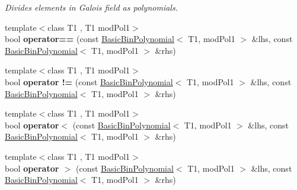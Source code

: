 \begin{DoxyCompactItemize}
\begin{DoxyCompactList}\small\item\em Divides elements in Galois field as polynomials. \end{DoxyCompactList}\item 
\mbox{\label{class_g_flinalg_1_1_basic_bin_polynomial_ab9397147b5c3c4330a067c57acf3b567}} 
{\footnotesize template$<$class T1 , T1 mod\+Pol1$>$ }\\bool {\bfseries operator==} (const \mbox{\hyperlink{class_g_flinalg_1_1_basic_bin_polynomial}{Basic\+Bin\+Polynomial}}$<$ T1, mod\+Pol1 $>$ \&lhs, const \mbox{\hyperlink{class_g_flinalg_1_1_basic_bin_polynomial}{Basic\+Bin\+Polynomial}}$<$ T1, mod\+Pol1 $>$ \&rhs)
\item 
\mbox{\label{class_g_flinalg_1_1_basic_bin_polynomial_a657967bf1ec7f712f306a2baf360d0bd}} 
{\footnotesize template$<$class T1 , T1 mod\+Pol1$>$ }\\bool {\bfseries operator !=} (const \mbox{\hyperlink{class_g_flinalg_1_1_basic_bin_polynomial}{Basic\+Bin\+Polynomial}}$<$ T1, mod\+Pol1 $>$ \&lhs, const \mbox{\hyperlink{class_g_flinalg_1_1_basic_bin_polynomial}{Basic\+Bin\+Polynomial}}$<$ T1, mod\+Pol1 $>$ \&rhs)
\item 
\mbox{\label{class_g_flinalg_1_1_basic_bin_polynomial_a81a0b19946f6ec76b2c8af6f5006bb7b}} 
{\footnotesize template$<$class T1 , T1 mod\+Pol1$>$ }\\bool {\bfseries operator$<$} (const \mbox{\hyperlink{class_g_flinalg_1_1_basic_bin_polynomial}{Basic\+Bin\+Polynomial}}$<$ T1, mod\+Pol1 $>$ \&lhs, const \mbox{\hyperlink{class_g_flinalg_1_1_basic_bin_polynomial}{Basic\+Bin\+Polynomial}}$<$ T1, mod\+Pol1 $>$ \&rhs)
\item 
\mbox{\label{class_g_flinalg_1_1_basic_bin_polynomial_a2e8ce053e215f9feed7735549a1df344}} 
{\footnotesize template$<$class T1 , T1 mod\+Pol1$>$ }\\bool {\bfseries operator $>$} (const \mbox{\hyperlink{class_g_flinalg_1_1_basic_bin_polynomial}{Basic\+Bin\+Polynomial}}$<$ T1, mod\+Pol1 $>$ \&lhs, const \mbox{\hyperlink{class_g_flinalg_1_1_basic_bin_polynomial}{Basic\+Bin\+Polynomial}}$<$ T1, mod\+Pol1 $>$ \&rhs)
\item 

\end{DoxyCompactItemize}
